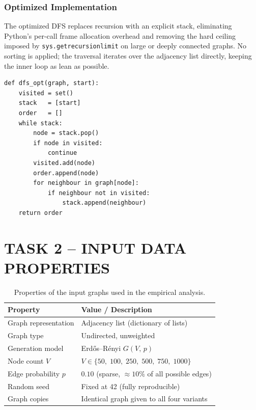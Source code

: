 \documentclass[12pt,a4paper]{article}
\begin{document}
	\subsubsection{Optimized Implementation}
	
	The optimized DFS replaces recursion with an explicit stack, eliminating Python's
	per-call frame allocation overhead and removing the hard ceiling imposed by
	\texttt{sys.getrecursionlimit} on large or deeply connected graphs. No sorting is
	applied; the traversal iterates over the adjacency list directly, keeping the inner
	loop as lean as possible.
	
	\begin{lstlisting}[caption={DFS (optimized) -- iterative stack-based traversal, no recursion overhead.}]
def dfs_opt(graph, start):
	visited = set()
	stack   = [start]
	order   = []
	while stack:
		node = stack.pop()
		if node in visited:
			continue
		visited.add(node)
		order.append(node)
		for neighbour in graph[node]:
			if neighbour not in visited:
				stack.append(neighbour)
	return order
	\end{lstlisting}
	
	\section{TASK 2 -- INPUT DATA PROPERTIES}
	
	\begin{table}[h!]
		\centering
		\caption{Properties of the input graphs used in the empirical analysis.}
		\label{tab:input}
		\renewcommand{\arraystretch}{1.3}
		\begin{tabular}{ll}
			\toprule
			\textbf{Property}        & \textbf{Value / Description} \\
			\midrule
			Graph representation     & Adjacency list (dictionary of lists) \\
			Graph type               & Undirected, unweighted \\
			Generation model         & Erd\H{o}s--R\'{e}nyi $G(V,\,p)$ \\
			Node count $V$           & $V \in \{50,\;100,\;250,\;500,\;750,\;1000\}$ \\
			Edge probability $p$     & $0.10$ (sparse, $\approx 10\%$ of all possible edges) \\
			Random seed              & Fixed at 42 (fully reproducible) \\
			Graph copies             & Identical graph given to all four variants \\
			\bottomrule
		\end{tabular}
	\end{table}
	
\end{document}
